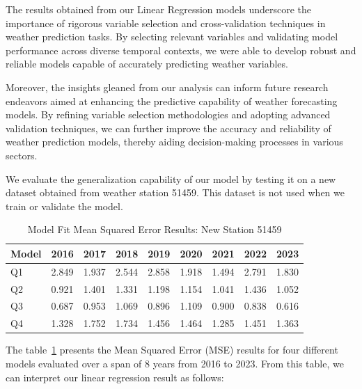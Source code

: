 \documentclass[12pt]{article}
\begin{document}
The results obtained from our Linear Regression models underscore the importance of rigorous variable selection and cross-validation techniques in weather prediction tasks. By selecting relevant variables and validating model performance across diverse temporal contexts, we were able to develop robust and reliable models capable of accurately predicting weather variables.

Moreover, the insights gleaned from our analysis can inform future research endeavors aimed at enhancing the predictive capability of weather forecasting models. By refining variable selection methodologies and adopting advanced validation techniques, we can further improve the accuracy and reliability of weather prediction models, thereby aiding decision-making processes in various sectors.


We evaluate the generalization capability of our model by testing it on a new dataset obtained from weather station 51459. This dataset is not used when we train or validate the model.

\begin{table}[h]
\centering
\caption{Model Fit Mean Squared Error Results: New Station 51459}
\label{tab:model_fit_mse}
\begin{tabular}{@{}lllllllll@{}}
\toprule
\textbf{Model} & \textbf{2016} & \textbf{2017} & \textbf{2018} & \textbf{2019} & \textbf{2020} & \textbf{2021} & \textbf{2022} & \textbf{2023} \\ 
\midrule
Q1        & 2.849            & 1.937            & 2.544            & 2.858            & 1.918            & 1.494            & 2.791            & 1.830            \\
Q2        & 0.921            & 1.401            & 1.331            & 1.198            & 1.154            & 1.041            & 1.436            & 1.052            \\
Q3        & 0.687            & 0.953            & 1.069            & 0.896            & 1.109            & 0.900            & 0.838            & 0.616            \\
Q4        & 1.328            & 1.752            & 1.734            & 1.456            & 1.464            & 1.285            & 1.451            & 1.363            \\ 
\bottomrule
\end{tabular}
\end{table}

The table~\ref{tab:model_fit_mse} presents the Mean Squared Error (MSE) results for four different models evaluated over a span of 8 years from 2016 to 2023. From this table, we can interpret our linear regression result as follows:
\end{document}
